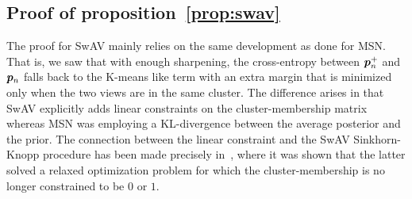 \documentclass{article} %
\begin{document}
\subsection{Proof of proposition~\ref{prop:swav}}
\label{proof:swav}

The proof for SwAV mainly relies on the same development as done for MSN. That is, we saw that with enough sharpening, the cross-entropy between ${\bm{p}}_{n}^+$ and ${\bm{p}}_n$ falls back to the K-means like term with an extra margin that is minimized only when the two views are in the same cluster. The difference arises in that SwAV explicitly adds linear constraints on the cluster-membership matrix whereas MSN was employing a KL-divergence between the average posterior and the prior. The connection between the linear constraint and the SwAV Sinkhorn-Knopp procedure has been made precisely in~\citet{wang2010learning}, where it was shown that the latter solved a relaxed optimization problem for which the cluster-membership is no longer constrained to be $0$ or $1$.
\end{document}
